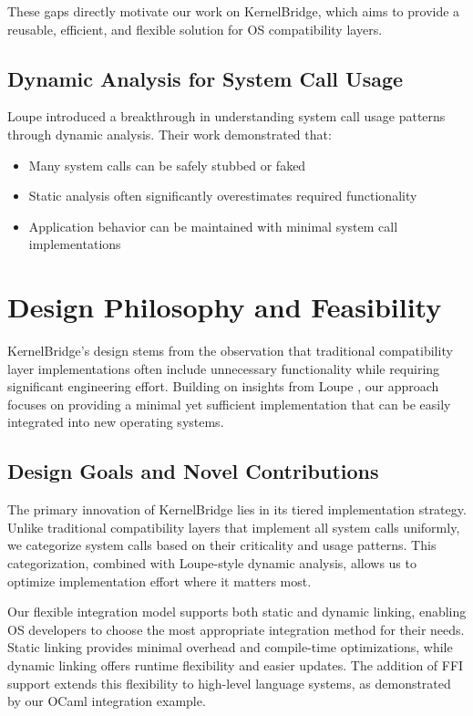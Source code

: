\documentclass[conference]{IEEEtran}
\begin{document}
These gaps directly motivate our work on KernelBridge, which aims to provide a reusable, efficient, and flexible solution for OS compatibility layers.
\subsection{Dynamic Analysis for System Call Usage}
Loupe \cite{lefeuvre2024loupe} introduced a breakthrough in understanding system call usage patterns through dynamic analysis. Their work demonstrated that:
\begin{itemize}
	\item Many system calls can be safely stubbed or faked
	\item Static analysis often significantly overestimates required functionality
	\item Application behavior can be maintained with minimal system call implementations
\end{itemize}

\section{Design Philosophy and Feasibility}

KernelBridge's design stems from the observation that traditional compatibility layer implementations often include unnecessary functionality while requiring significant engineering effort. Building on insights from Loupe \cite{lefeuvre2024loupe}, our approach focuses on providing a minimal yet sufficient implementation that can be easily integrated into new operating systems.

\subsection{Design Goals and Novel Contributions}
The primary innovation of KernelBridge lies in its tiered implementation strategy. Unlike traditional compatibility layers that implement all system calls uniformly, we categorize system calls based on their criticality and usage patterns. This categorization, combined with Loupe-style dynamic analysis, allows us to optimize implementation effort where it matters most.

Our flexible integration model supports both static and dynamic linking, enabling OS developers to choose the most appropriate integration method for their needs. Static linking provides minimal overhead and compile-time optimizations, while dynamic linking offers runtime flexibility and easier updates. The addition of FFI support extends this flexibility to high-level language systems, as demonstrated by our OCaml integration example.
\end{document}
